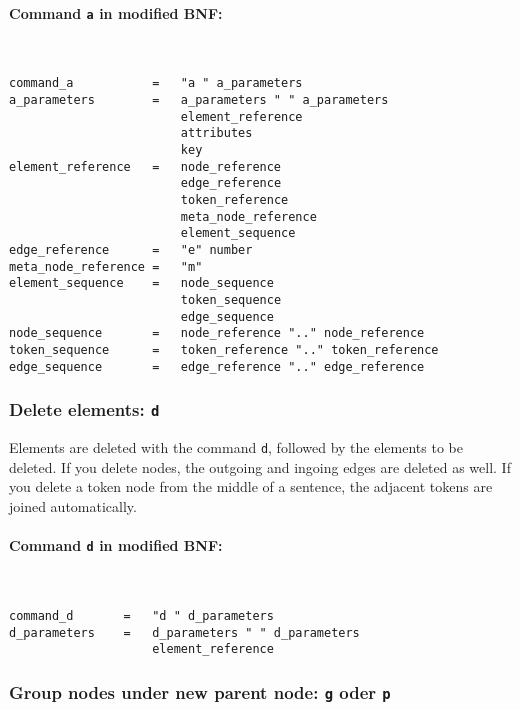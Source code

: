 \documentclass[12pt]{scrartcl}
\begin{document}
\paragraph*{Command \texttt{a} in modified BNF:}
~
\begin{framed}
\begin{lstlisting}
command_a           =   "a " a_parameters
a_parameters        =   a_parameters " " a_parameters
                        element_reference
                        attributes
                        key
element_reference   =   node_reference
                        edge_reference
                        token_reference
                        meta_node_reference
                        element_sequence
edge_reference      =   "e" number
meta_node_reference =   "m"
element_sequence    =   node_sequence
                        token_sequence
                        edge_sequence
node_sequence       =   node_reference ".." node_reference
token_sequence      =   token_reference ".." token_reference
edge_sequence       =   edge_reference ".." edge_reference
\end{lstlisting}
\end{framed}


\subsubsection{Delete elements: \texttt{d}}

Elements are deleted with the command \texttt{d}, followed by the elements to be deleted.
If you delete nodes, the outgoing and ingoing edges are deleted as well.
If you delete a token node from the middle of a sentence, the adjacent tokens are joined automatically.

\paragraph*{Command \texttt{d} in modified BNF:}
~
\begin{framed}
\begin{lstlisting}
command_d       =   "d " d_parameters
d_parameters    =   d_parameters " " d_parameters
                    element_reference
\end{lstlisting}
\end{framed}


\subsubsection{Group nodes under new parent node: \texttt{g} oder \texttt{p}}
\end{document}
